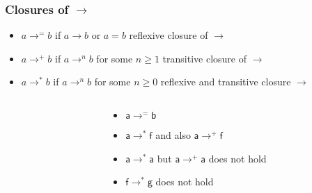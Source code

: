 \documentclass[12pt,aspectratio=169]{beamer}
\newcommand{\m}[1]{\mathsf{#1}}
\begin{document}
\begin{frame}
    \frametitle{Closures of $\rightarrow$}
    \begin{definition}
        \begin{itemize}
            \item \alert{$a \rightarrow^{=} b$} if $a\rightarrow b$ or $a = b$ \hfill reflexive closure of $\rightarrow$
            \item \alert{$a \rightarrow^{+} b$} if $a\rightarrow^{n} b$ for some $n \geq 1$ \hfill transitive closure of $\rightarrow$
            \item \alert{$a \rightarrow^{*} b$} if $a\rightarrow^{n} b$ for some $n \geq 0$ \hfill reflexive and transitive closure $\rightarrow$
        \end{itemize}
    \end{definition}

    \begin{example}
    \begin{columns}
        \begin{column}{0.35\textwidth}
            \centering
            \fig
        \end{column}
        \begin{column}{0.5\textwidth}
            \begin{itemize}
                \item $\m{a} \rightarrow^{=} \m{b}$
                \item $\m{a} \rightarrow^{*} \m{f}$ and also $\m{a} \rightarrow^{+} \m{f}$
                \item $\m{a} \rightarrow^{*} \m{a}$ but $\m{a} \rightarrow^{+} \m{a}$ does not hold
                \item $\m{f} \rightarrow^{*} \m{g}$ does not hold
            \end{itemize}
        \end{column}
        \end{columns}
    \end{example}
\end{frame}
\end{document}
